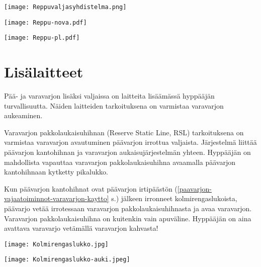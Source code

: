 \begin{Figure}\centering\texttt{[image: Reppuvaljasyhdistelma.png]}\end{Figure} 


\begin{Figure}\centering\texttt{[image: Reppu-nova.pdf]}\end{Figure} 


\begin{Figure}\centering\texttt{[image: Reppu-pl.pdf]}\end{Figure} 

\section{ Lisälaitteet }
\label{laskuvarjokalusto-ja-hyppyvarusteet-lisalaitteet}


Pää- ja varavarjon lisäksi valjaissa on laitteita lisäämässä hyppääjän turvallisuutta. Näiden laitteiden tarkoituksena on varmistaa varavarjon aukeaminen. 


Varavarjon pakkolaukaisuhihnan (Reserve Static Line, RSL) tarkoituksena on varmistaa varavarjon avautuminen päävarjon irrottua valjaista. Järjestelmä liittää päävarjon kantohihnan ja varavarjon aukaisujärjestelmän yhteen. Hyppääjän on mahdollista vapauttaa varavarjon pakkolaukaisuhihna avaamalla päävarjon kantohihnaan kytketty pikalukko. 


Kun päävarjon kantohihnat ovat päävarjon irtipäästön (\ref{paavarjon-vajaatoiminnot-varavarjon-kaytto} s.\pageref{paavarjon-vajaatoiminnot-varavarjon-kaytto}) jälkeen irronneet kolmirengaslukoista, päävarjo vetää irrotessaan varavarjon pakkolaukaisuhihnasta ja avaa varavarjon. Varavarjon pakkolaukaisuhihna on kuitenkin vain apuväline. Hyppääjän on aina avattava varavarjo vetämällä varavarjon kahvasta! 


\begin{Figure}\centering\texttt{[image: Kolmirengaslukko.jpg]}\end{Figure} \begin{Figure}\centering\texttt{[image: Kolmirengaslukko-auki.jpeg]}\end{Figure} 


